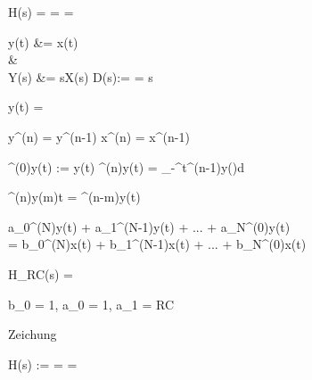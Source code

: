 \begin{abox}
	H(s) =  =  = 
\end{abox}

\begin{abox}
	y(t) &= x(t)\\
	& \ztrans\\
	Y(s) &= s\cdot X(s) \implies D(s):=  = s
\end{abox}

\begin{abox}
	y(t) =
\end{abox}


\begin{abox}
	y^{(n)} = y^{(n-1)} \quad {} \quad x^{(n)} = x^{(n-1)}
\end{abox}


\begin{abox}
	\int^{(0)}y(t) := y(t)  \int^{(n)}y(t) = \int_{-\infty}^{t}\int^{(n-1)}y(\tau)d\tau
\end{abox}

\begin{abox}
	\int^{(n)}y(m)t = \int^{(n-m)}y(t)
\end{abox}

\begin{abox}
	a_0\int^{(N)}y(t) + a_1\int^{(N-1)}y(t) + ... + a_N\int^{(0)}y(t)\\
	= b_0\int^{(N)}x(t) + b_1\int^{(N-1)}x(t) + ... + b_N\int^{(0)}x(t)
\end{abox}

\begin{abox}
	H_{RC}(s) = 
\end{abox}

\begin{abox}
	b_0 = 1, a_0 = 1, a_1 = RC
\end{abox}

\begin{abox}
	Zeichung
\end{abox}

\begin{abox}
	H(s) :=  =  = 
\end{abox}

